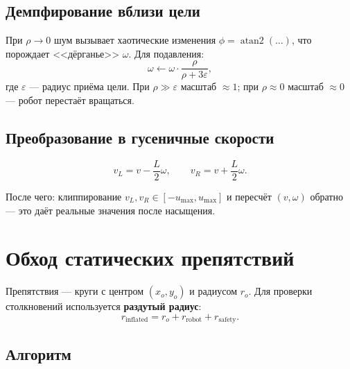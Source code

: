 \documentclass[12pt, a4paper]{article}
\newcommand{\atantwo}{\operatorname{atan2}}
\theoremstyle{definition}
\theoremstyle{plain}
\begin{document}
\subsection{Демпфирование вблизи цели}

При $\rho \to 0$ шум вызывает хаотические изменения $\phi = \atantwo(\ldots)$,
что порождает <<дёрганье>> $\omega$.  Для подавления:
\begin{equation}\label{eq:near_goal_damp}
  \omega \leftarrow \omega \cdot \frac{\rho}{\rho + 3\varepsilon},
\end{equation}
где $\varepsilon$ --- радиус приёма цели.  При $\rho \gg \varepsilon$ масштаб
$\approx 1$; при $\rho \approx 0$ масштаб $\approx 0$ --- робот перестаёт вращаться.

\subsection{Преобразование в гусеничные скорости}

\begin{equation}\label{eq:uni2tracks}
  v_L = v - \frac{L}{2}\omega, \qquad v_R = v + \frac{L}{2}\omega.
\end{equation}

После чего: клиппирование $v_L, v_R \in [-u_{\max}, u_{\max}]$ и пересчёт
$(v, \omega)$ обратно --- это даёт реальные значения после насыщения.

\section{Обход статических препятствий}\label{sec:obstacles}

Препятствия --- круги с центром $(x_o, y_o)$ и радиусом $r_o$.  Для проверки
столкновений используется \textbf{раздутый радиус}:
\begin{equation}
  r_{\text{inflated}} = r_o + r_{\text{robot}} + r_{\text{safety}}.
\end{equation}

\subsection{Алгоритм}
\end{document}
